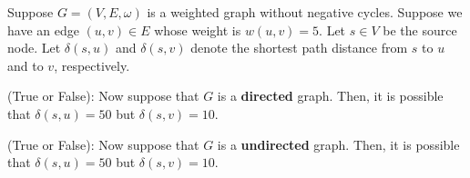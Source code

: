 \begin{prob}
    Suppose $G = (V, E, \omega)$ is a weighted graph without negative cycles. 
        Suppose we have an edge $(u, v) \in E$ whose weight is $w(u, v) = 5$. 
        Let $s\in V$ be the source node. Let $\delta(s, u)$ and $\delta(s, v)$ denote the shortest path distance from $s$ to $u$ and to $v$, respectively. 
        
        
    \begin{subprobset}
        \begin{subprob}
       (True or False):  Now suppose that $G$ is a {\bf directed} graph. 
        Then, it is possible that $\delta(s, u) = 50$ but $\delta(s, v) = 10$. 
            \begin{soln}
            \end{soln}
            \end{subprob}
            \begin{subprob}
                (True or False): Now suppose that $G$ is a {\bf undirected} graph. 
                Then, it is possible that  $\delta(s, u) = 50$ but $\delta(s, v) = 10$. 
            \begin{soln}
            \end{soln}
        \end{subprob}
    \end{subprobset}
    
\end{prob}
    